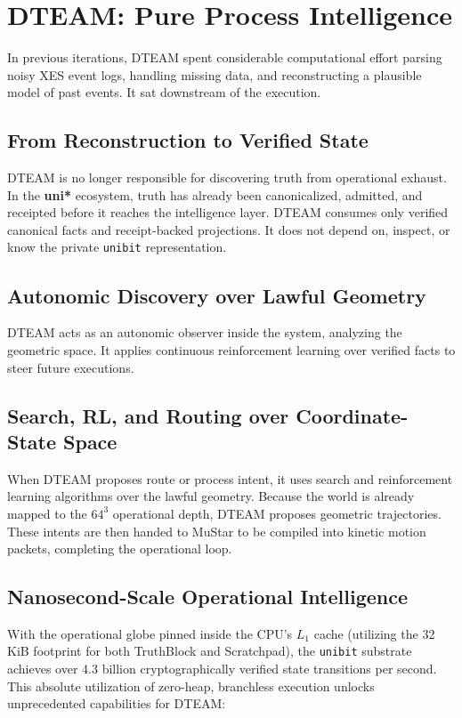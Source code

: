 \chapter{DTEAM: Pure Process Intelligence}

In previous iterations, DTEAM spent considerable computational effort parsing noisy XES event logs, handling missing data, and reconstructing a plausible model of past events. It sat downstream of the execution.

\section{From Reconstruction to Verified State}

DTEAM is no longer responsible for discovering truth from operational exhaust. In the \textbf{uni*} ecosystem, truth has already been canonicalized, admitted, and receipted before it reaches the intelligence layer. DTEAM consumes only verified canonical facts and receipt-backed projections. It does not depend on, inspect, or know the private \texttt{unibit} representation.

\section{Autonomic Discovery over Lawful Geometry}

DTEAM acts as an autonomic observer inside the system, analyzing the geometric space. It applies continuous reinforcement learning over verified facts to steer future executions.

\section{Search, RL, and Routing over Coordinate-State Space}

When DTEAM proposes route or process intent, it uses search and reinforcement learning algorithms over the lawful geometry. Because the world is already mapped to the $64^3$ operational depth, DTEAM proposes geometric trajectories. These intents are then handed to MuStar to be compiled into kinetic motion packets, completing the operational loop.

\section{Nanosecond-Scale Operational Intelligence}

With the operational globe pinned inside the CPU's $L_1$ cache (utilizing the 32 KiB footprint for both TruthBlock and Scratchpad), the \texttt{unibit} substrate achieves over 4.3 billion cryptographically verified state transitions per second. This absolute utilization of zero-heap, branchless execution unlocks unprecedented capabilities for DTEAM:

